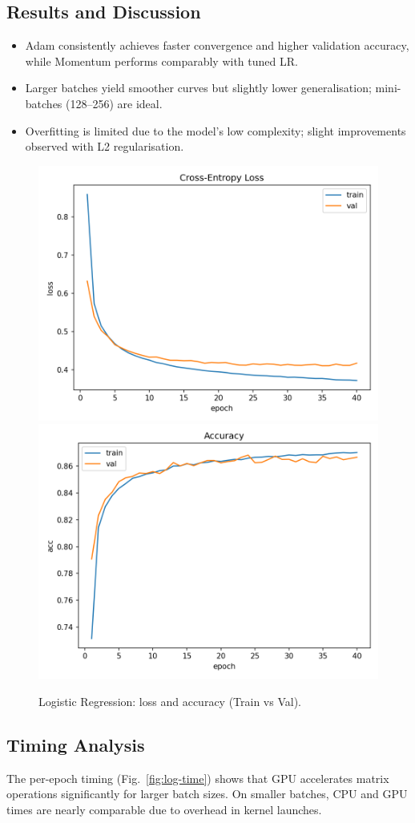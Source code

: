 \documentclass{article}
\begin{document}
\subsection{Results and Discussion}
\begin{itemize}
    \item Adam consistently achieves faster convergence and higher validation accuracy, while Momentum performs comparably with tuned LR.
    \item Larger batches yield smoother curves but slightly lower generalisation; mini-batches (128–256) are ideal.
    \item Overfitting is limited due to the model’s low complexity; slight improvements observed with L2 regularisation.
\end{itemize}

\begin{figure}[t]
\centering
\includegraphics[width=.48\linewidth]{figs/fashionmnist_adam_b256_lr0.001_val0.1_seed808_loss.png}\hfill
\includegraphics[width=.48\linewidth]{figs/fashionmnist_adam_b256_lr0.001_val0.1_seed808_acc.png}
\caption{Logistic Regression: loss and accuracy (Train vs Val).}
\label{fig:log-curves}
\end{figure}

\subsection{Timing Analysis}
The per-epoch timing (Fig.~\ref{fig:log-time}) shows that GPU accelerates matrix operations significantly for larger batch sizes. On smaller batches, CPU and GPU times are nearly comparable due to overhead in kernel launches.
\end{document}
